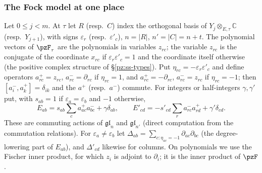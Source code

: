 \documentclass[10pt]{amsart}
\theoremstyle{definition}
\theoremstyle{remark}
\newcommand{\C}{\mathbb C}
\begin{document}
\subsubsection{The Fock model at one place}\label{par:ss-fock}
Let $0\le j<m$. At $\tau$ let $R$ (resp.\ $C$) index the orthogonal basis of
$Y_j\otimes_{E,\tau}\C$ (resp.\ $Y_{j+1}$), with signs $\varepsilon_r$ (resp.\ $\varepsilon'_c$),
$n=|R|$, $n'=|C|=n+t$. The polynomial vectors of $\pzF_\tau$ are the polynomials in variables
$z_{rc}$; the variable $z_{rc}$ is the conjugate of the coordinate $x_{rc}$ if
$\varepsilon_r\varepsilon'_c=1$ and the coordinate itself otherwise (the positive complex structure
of \S\ref{pz:ss-types}). Put $\eta_{rc}=-\varepsilon_r\varepsilon'_c$ and define operators
$a^+_{rc}=z_{rc}$, $a^-_{rc}=\partial_{rc}$ if $\eta_{rc}=1$, and $a^+_{rc}=-\partial_{rc}$,
$a^-_{rc}=z_{rc}$ if $\eta_{rc}=-1$; then $[a^-_i,a^+_k]=\delta_{ik}$ and the $a^+$ (resp.\ $a^-$)
commute. For integers or half-integers $\gamma,\gamma'$ put, with $s_{ab}=1$ if
$\varepsilon_a=\varepsilon_b$ and $-1$ otherwise,
\begin{equation}\label{par:eq-osc}
E_{ab}=s_{ab}\sum_{c}a^+_{ac}a^-_{bc}+\gamma\delta_{ab},\qquad
E'_{cd}=-s'_{cd}\sum_ra^-_{rc}a^+_{rd}+\gamma'\delta_{cd}.
\end{equation}
These are commuting actions of $\mathfrak{gl}_n$ and $\mathfrak{gl}_{n'}$ (direct computation from the
commutation relations). For $\varepsilon_a\ne\varepsilon_b$ let $\Delta_{ab}=\sum_{c:\eta_{ac}=-1}
\partial_{ac}\partial_{bc}$ (the degree-lowering part of $E_{ab}$), and $\Delta'_{cd}$ likewise for
columns. On polynomials we use the Fischer inner product, for which $z_i$ is adjoint to $\partial_i$;
it is the inner product of $\pzF$.
\end{document}
